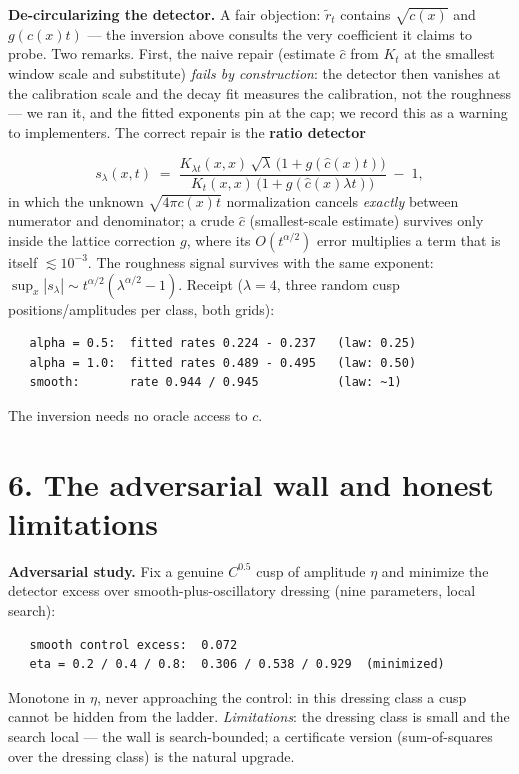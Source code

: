 \documentclass[11pt]{article}
\begin{document}
\textbf{De-circularizing the detector.}  A fair objection: $\tilde r_t$ contains $\sqrt{c(x)}$ and $g(c(x)t)$ — the inversion above consults the very coefficient it claims to probe.  Two remarks.  First, the naive repair (estimate $\hat c$ from $K_t$ at the smallest window scale and substitute) \emph{fails by construction}: the detector then vanishes at the calibration scale and the decay fit measures the calibration, not the roughness — we ran it, and the fitted exponents pin at the cap; we record this as a warning to implementers.  The correct repair is the \textbf{ratio detector}

\[
s_\lambda(x,t) \;=\;
\frac{K_{\lambda t}(x,x)\,\sqrt\lambda\,\bigl(1+g(\hat c(x)t)\bigr)}
     {K_t(x,x)\,\bigl(1+g(\hat c(x)\lambda t)\bigr)} \;-\; 1,
\]
in which the unknown $\sqrt{4\pi c(x)t}$ normalization cancels \emph{exactly} between numerator and denominator; a crude $\hat c$ (smallest-scale estimate) survives only inside the lattice correction $g$, where its $O(t^{\alpha/2})$ error multiplies a term that is itself $\lesssim 10^{-3}$.  The roughness signal survives with the same exponent: $\sup_x|s_\lambda| \sim t^{\alpha/2}(\lambda^{\alpha/2}-1)$.  Receipt ($\lambda = 4$, three random cusp positions/amplitudes per class, both grids):

\begin{small}\begin{verbatim}
   alpha = 0.5:  fitted rates 0.224 - 0.237   (law: 0.25)
   alpha = 1.0:  fitted rates 0.489 - 0.495   (law: 0.50)
   smooth:       rate 0.944 / 0.945           (law: ~1)
\end{verbatim}\end{small}
The inversion needs no oracle access to $c$.

\section*{6. The adversarial wall and honest limitations}
\textbf{Adversarial study.}  Fix a genuine $C^{0.5}$ cusp of amplitude $\eta$ and minimize the detector excess over smooth-plus-oscillatory dressing (nine parameters, local search):

\begin{small}\begin{verbatim}
   smooth control excess:  0.072
   eta = 0.2 / 0.4 / 0.8:  0.306 / 0.538 / 0.929  (minimized)
\end{verbatim}\end{small}
Monotone in $\eta$, never approaching the control: in this dressing class a cusp cannot be hidden from the ladder.  \emph{Limitations}: the dressing class is small and the search local — the wall is search-bounded; a certificate version (sum-of-squares over the dressing class) is the natural upgrade.
\end{document}
